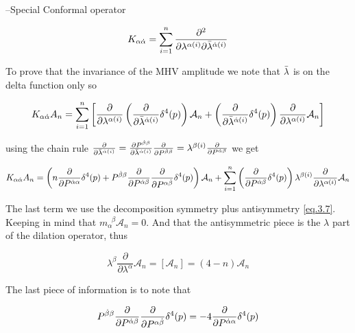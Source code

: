 --Special Conformal operator

\begin{equation}
K_{\alpha \dot{\alpha}} = \sum_{i=1}^{n}  \frac{\partial^{2}}{\partial \lambda^{\alpha(i)}\partial \bar{\lambda}^{\dot{\alpha}(i)}}
\end{equation}
 


To prove that the invariance of the MHV amplitude we note that $\bar{\lambda}$ is on the delta function only so

 \begin{align}
 K_{\alpha \dot{\alpha}}A_{n} =  \sum_{i=1}^{n} \left[
\frac{\partial}{\partial \lambda^{\alpha(i)}} \left(  
  \frac{\partial}{\partial \bar{\lambda}^{\dot{\alpha}(i)}} \delta^{4}(p)
 \right) \mathcal{A}_{n}  + \left(  
   \frac{\partial}{\partial \bar{\lambda}^{\dot{\alpha}(i)}} \delta^{4}(p)
  \right)\frac{\partial}{\partial \lambda^{\alpha(i)}} \mathcal{A}_{n} \right]
 \end{align}


using the chain rule $\frac{\partial}{\partial \bar{\lambda}^{\dot{\alpha}(i)}} = \frac{\partial P^{\dot{\beta} \beta}}{\partial \bar{\lambda}^{\dot{\alpha}(i)}} \frac{\partial}{\partial P^{\dot{\beta} \beta}} = \lambda^{\beta(i)} \frac{\partial}{\partial P^{\dot{\alpha}\beta}}$ we get 


 \begin{align}
 K_{\alpha \dot{\alpha}}A_{n} = 
  \left(
 n\frac{\partial}{\partial P^{\dot{\alpha} \alpha}} \delta^{4}(p) +   
  P^{\dot{\beta} \beta} \frac{\partial}{\partial P^{\dot{\alpha}\beta}}\frac{\partial}{\partial P^{\alpha\dot{\beta}}} \delta^{4}(p)
 \right) \mathcal{A}_{n}  + 
\sum_{i=1}^{n}
 \left(  
   \frac{\partial}{\partial P^{\dot{\alpha}\beta}} \delta^{4}(p)
  \right)  \lambda^{\beta(i)} \frac{\partial}{\partial \lambda^{\alpha(i)}} \mathcal{A}_{n} 
 \label{eq.3.10}
 \end{align}
 


The last term we use the decomposition symmetry plus antisymmetry \eqref{eq.3.7}. Keeping in mind that $m_{\alpha}^{\;\; \beta} \mathcal{A}_{n}  =0$. And that the antisymmetric piece is the $\lambda $  part of the dilation operator, thus

\begin{equation}
\lambda^{\beta}\frac{\partial}{\partial \lambda^{\alpha}}\mathcal{A}_{n} = [\mathcal{A}_{n}] = (4 - n)\mathcal{A}_{n}
\label{eq.3.8}
\end{equation}


The last piece of information is to note that 

\begin{equation}
P^{\dot{\beta} \beta} \frac{\partial}{\partial P^{\dot{\alpha}\beta}}\frac{\partial}{\partial P^{\alpha\dot{\beta}}} \delta^{4}(p) = -4 \frac{\partial}{\partial P^{\dot{\alpha}\alpha}} \delta^{4}(p)
\label{eq.3.9}
\end{equation}


